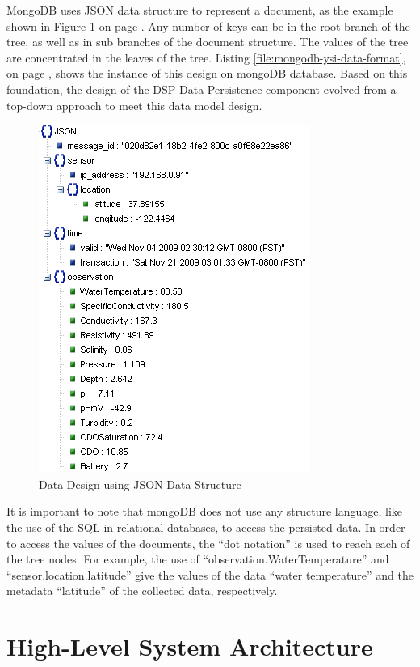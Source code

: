 MongoDB uses JSON data structure \cite{json} to represent a document, as the
example shown in Figure \ref{fig:kvp-json-viewer} on page
\pageref{fig:kvp-json-viewer}. Any number of keys can be in the root branch of
the tree, as well as in sub branches of the document structure. The values of
the tree are concentrated in the leaves of the tree. Listing
\ref{file:mongodb-ysi-data-format}, on page
\pageref{file:mongodb-ysi-data-format}, shows the instance of this design on
mongoDB database. Based on this foundation, the design of the DSP Data
Persistence component evolved from a top-down approach to meet this data model
design.

\begin{figure}[!h]
  \centering
  \includegraphics[scale=0.65]{../diagrams/kvp-json-viewer}
  \caption{Data Design using JSON Data Structure}
  \label{fig:kvp-json-viewer}
\end{figure}

It is important to note that mongoDB does not use any structure language, like
the use of the SQL in relational databases, to access the persisted data. In
order to access the values of the documents, the ``dot notation''
\cite{db-mongo-data-access} is used to reach each of the tree nodes. For
example, the use of ``observation.WaterTemperature'' and
``sensor.location.latitude'' give the values of the data ``water temperature'' and
the metadata ``latitude'' of the collected data, respectively.

\section{High-Level System Architecture}
\label{sec:system-architecture}

